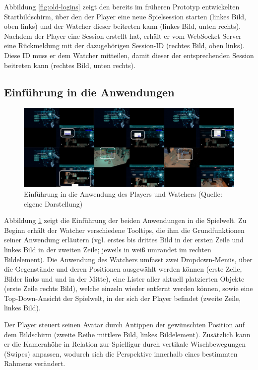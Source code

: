 Abbildung \ref{fig:old-logins} zeigt den bereits im früheren Prototyp entwickelten Startbildschirm, über den der Player eine neue Spielsession starten (linkes Bild, oben links) und der Watcher dieser beitreten kann (linkes Bild, unten rechts). Nachdem der Player eine Session erstellt hat, erhält er vom WebSocket-Server eine Rückmeldung mit der dazugehörigen Session-ID (rechtes Bild, oben links). Diese ID muss er dem Watcher mitteilen, damit dieser der entsprechenden Session beitreten kann (rechtes Bild, unten rechts).

\subsection{Einführung in die Anwendungen}

\begin{figure}[ht]
\centering
\includegraphics[width=1\linewidth]{content/pictures/Introduction.png}
\caption{Einführung in die Anwendung des Players und Watchers (Quelle: eigene Darstellung)}
\label{fig:old-introductions}
\end{figure}

Abbildung \ref{fig:old-introductions} zeigt die Einführung der beiden Anwendungen in die Spielwelt. Zu Beginn erhält der Watcher verschiedene Tooltips, die ihm die Grundfunktionen seiner Anwendung erläutern (vgl. erstes bis drittes Bild in der ersten Zeile und linkes Bild in der zweiten Zeile; jeweils in weiß umrandet im rechten Bildelement). Die Anwendung des Watchers umfasst zwei Dropdown-Menüs, über die Gegenstände und deren Positionen ausgewählt werden können (erste Zeile, Bilder links und und in der Mitte), eine Lister aller aktuell platzierten Objekte (erste Zeile rechts Bild), welche einzeln wieder entfernt werden können, sowie eine Top-Down-Ansicht der Spielwelt, in der sich der Player befindet (zweite Zeile, linkes Bild). 

Der Player steuert seinen Avatar durch Antippen der gewünschten Position auf dem Bildschirm (zweite Reihe mittlere Bild, linkes Bildelement). Zusätzlich kann er die Kamerahöhe in Relation zur Spielfigur durch vertikale Wischbewegungen (Swipes) anpassen, wodurch sich die Perspektive innerhalb eines bestimmten Rahmens verändert.

